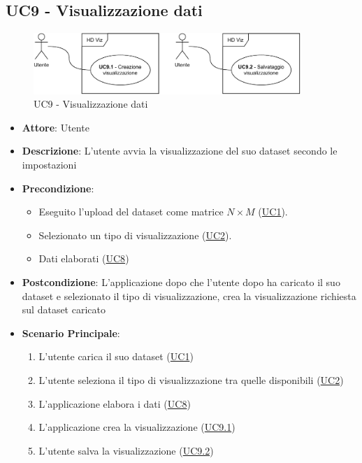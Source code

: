 \subsection{UC9 - Visualizzazione dati}
    \label{uc9}
    
    \begin{figure}[htbp]
        \centering
        \includegraphics[width=0.9\textwidth]{source/sections/casi-uso/diagrams/uc9.pdf}
        \caption{UC9 - Visualizzazione dati}
        \label{fig:uc9}
    \end{figure}
    
    \begin{itemize}
    \item \textbf{Attore}: Utente
    \item \textbf{Descrizione}: L'utente avvia la visualizzazione del suo dataset secondo le impostazioni
    \item \textbf{Precondizione}: 
    \begin{itemize}
        \item Eseguito l'upload del dataset come matrice $N\times M$ (\hyperref[uc1]{UC1}).
        \item Selezionato un tipo di visualizzazione (\hyperref[uc2]{UC2}).
        \item Dati elaborati (\hyperref[uc8]{UC8})
    \end{itemize}  
    \item \textbf{Postcondizione}: L'applicazione dopo che l'utente dopo ha caricato il suo dataset e selezionato il tipo di visualizzazione, crea la visualizzazione richiesta sul dataset caricato
    \item \textbf{Scenario Principale}: 
    \begin{enumerate}
        \item L'utente carica il suo dataset (\hyperref[uc1]{UC1})
        \item L'utente seleziona il tipo di visualizzazione tra quelle disponibili (\hyperref[uc2]{UC2})
        \item L'applicazione elabora i dati (\hyperref[uc8]{UC8})
        \item L'applicazione crea la visualizzazione (\hyperref[uc9.1]{UC9.1})
        \item L'utente salva la visualizzazione (\hyperref[uc9.2]{UC9.2})
    \end{enumerate}
    \end{itemize}
    
